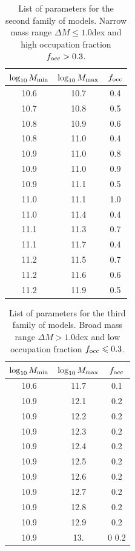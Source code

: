 \documentclass[usenatbib]{mn2e}
\begin{document}
\begin{table}
\begin{center}
\begin{tabular}{ccc}\hline\hline
$\log_{10}M_{\rm min}$ & $\log_{10}M_{\rm max}$ & $f_{\rm occ}$\\\hline
10.6& 10.7& 0.4\\
10.7& 10.8& 0.5\\
10.8& 10.9& 0.6\\
10.8& 11.0& 0.4\\
10.9& 11.0& 0.8\\
10.9& 11.0& 0.9\\
10.9& 11.1& 0.5\\
11.0& 11.1& 1.0\\
11.0& 11.4& 0.4\\
11.1& 11.3& 0.7\\
11.1& 11.7& 0.4\\
11.2& 11.5& 0.7\\
11.2& 11.6& 0.6\\
11.2& 11.9& 0.5\\\hline\hline
\end{tabular}
\end{center}
\caption{\label{table:secondfamily}List of parameters for the second family of models. Narrow
  mass range $\Delta M\leq 1.0$dex and high occupation fraction $f_{\rm occ}>0.3$.}
\end{table}






\begin{table}
\begin{center}
\begin{tabular}{ccc}\hline\hline
$\log_{10}M_{\rm min}$ & $\log_{10}M_{\rm max}$ & $f_{\rm occ}$\\\hline
10.6& 11.7& 0.1\\
10.9& 12.1& 0.2\\
10.9& 12.2& 0.2\\
10.9& 12.3& 0.2\\
10.9& 12.4& 0.2\\
10.9& 12.5& 0.2\\
10.9& 12.6& 0.2\\
10.9& 12.7& 0.2\\
10.9& 12.8& 0.2\\
10.9& 12.9& 0.2\\
10.9& 13.&0 0.2\\\hline\hline
\end{tabular}
\end{center}
\caption{\label{table:thirdfamily}List of parameters for the third family of models. Broad
  mass range $\Delta M >1.0$dex and low occupation fraction $f_{\rm occ}\leq0.3$.}
\end{table}



 
\end{document}
